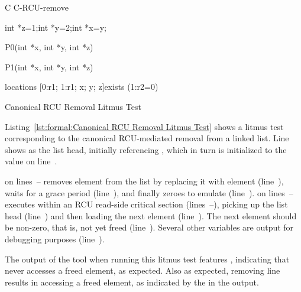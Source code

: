 \begin{listing}[tb]
\begin{linelabel}
\begin{VerbatimL}[commandchars=\\\[\]]
C C-RCU-remove

{
	int *z=1;\lnlbl[tail:2]
	int *y=2;\lnlbl[tail:1]
	int *x=y;\lnlbl[head]
}

P0(int *x, int *y, int *z)\lnlbl[P0end]

P1(int *x, int *y, int *z)\lnlbl[P1end]

locations [0:r1; 1:r1; x; y; z]\lnlbl[locations]
exists (1:r2=0)\lnlbl[exists]
\end{VerbatimL}
\end{linelabel}
\caption{Canonical RCU Removal Litmus Test}
\label{lst:formal:Canonical RCU Removal Litmus Test}
\end{listing}

\begin{lineref}
Listing~\ref{lst:formal:Canonical RCU Removal Litmus Test}
shows a litmus test corresponding to the canonical RCU-mediated
removal from a linked list.
Line~ shows  as the list head, initially
referencing , which in turn is initialized to the value
 on line~.

 on lines~--
removes element  from the list by replacing it with element 
(line~),
waits for a grace period (line~),
and finally zeroes  to emulate  (line~).
 on lines~--
executes within an RCU read-side critical section
(lines~--),
picking up the list head (line~) and then
loading the next element (line~).
The next element should be non-zero, that is, not yet freed
(line~).
Several other variables are output for debugging purposes
(line~).

The output of the  tool when running this litmus test features
, indicating that  never accesses a freed element,
as expected.
Also as expected, removing line~ results in 
accessing a freed element, as indicated by the  in
the  output.
\end{lineref}

